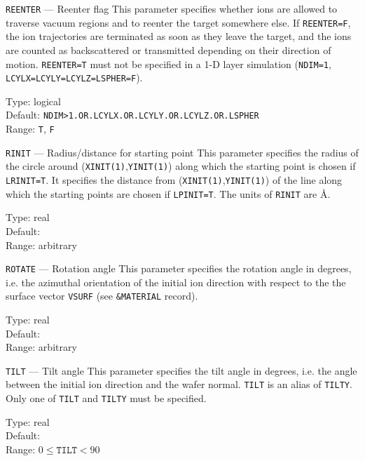 \begin{keydescription}{\texttt{REENTER} --- Reenter flag}
%
  This parameter specifies whether ions are allowed to traverse 
  vacuum regions and to reenter the target somewhere else. If
  \texttt{REENTER=F}, the ion trajectories are terminated as soon
  as they leave the target, and the ions are counted as backscattered or
  transmitted depending on their direction of motion. \texttt{REENTER=T} 
  must not be specified in a 1-D layer simulation (\texttt{NDIM=1},
  \texttt{LCYLX=LCYLY=LCYLZ=LSPHER=F}).
%
  \begin{keytab}
    Type:    \> logical \\
    Default: \>
    \texttt{NDIM>1.OR.LCYLX.OR.LCYLY.OR.LCYLZ.OR.LSPHER} \\
    Range:   \> \texttt{T}, \texttt{F}
  \end{keytab}
\end{keydescription}

\ifprivate
\begin{keydescription}{\texttt{RINIT} --- Radius/distance for starting point}
%
  This parameter specifies the radius of the circle around
  (\texttt{XINIT(1)},\texttt{YINIT(1)}) along which the starting point is
  chosen if \texttt{LRINIT=T}. It specifies the distance from
  (\texttt{XINIT(1)},\texttt{YINIT(1)}) of the line along which the starting
  points are chosen if \texttt{LPINIT=T}. The units of \texttt{RINIT}
  are \AA.
%
  \begin{keytab}
    Type:    \> real \\
    Default:  \\
    Range:   \> arbitrary
  \end{keytab}
\end{keydescription}
\fi

\begin{keydescription}{\texttt{ROTATE} --- Rotation angle}
%
  This parameter specifies the rotation angle in degrees, i.e. the
  azimuthal orientation of the initial ion direction with respect to
  the the surface vector \texttt{VSURF} (see \texttt{\&MATERIAL} record).
\begin{keytab}
   Type:    \> real \\
   Default:  \\
   Range:   \> arbitrary
\end{keytab}
\end{keydescription}

\begin{keydescription}{\texttt{TILT} --- Tilt angle}
%
  This parameter specifies the tilt angle in degrees, i.e. the angle
  between the initial ion direction and the wafer normal. \texttt{TILT} is
  an alias of \texttt{TILTY}. Only one of \texttt{TILT} and \texttt{TILTY} 
  must be specified.
%
  \begin{keytab}
    Type:    \> real \\
    Default:  \\
    Range:   \> $0 \le \texttt{TILT} < 90$
  \end{keytab}
\end{keydescription}

